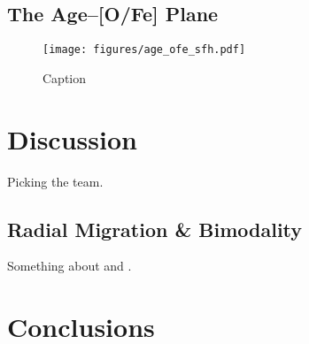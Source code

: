 \documentclass[twocolumn,linenumbers,twocolappendix]{aastex631}
\begin{document}
\subsection{The Age--[O/Fe] Plane}
\label{sec:age-ofe}

\begin{figure}
    \centering
    \texttt{[image: figures/age\_ofe\_sfh.pdf]}
    \caption{Caption}
    \label{fig:age-ofe-sfh}
\end{figure}


\section{Discussion}
\label{sec:discussion}

Picking the team.



\subsection{Radial Migration \& Bimodality}

Something about \citet{Johnson2021-Migration} and \citet{Schonrich2009-RadialMixing}.

\section{Conclusions}
\label{sec:conclusions}
\end{document}

